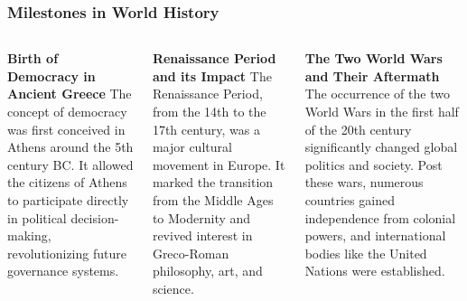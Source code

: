 \documentclass[5pt]{beamer}
\begin{document}
\begin{frame}
\frametitle{Milestones in World History}
\begin{columns}
\begin{column}{0.3\textwidth}
\begin{block}{\textbf{Birth of Democracy in Ancient Greece}}
The concept of democracy was first conceived in Athens around the 5th century BC. It allowed the citizens of Athens to participate directly in political decision-making, revolutionizing future governance systems.
\end{block}
\end{column}
\begin{column}{0.3\textwidth}
\begin{block}{\textbf{Renaissance Period and its Impact}}
The Renaissance Period, from the 14th to the 17th century, was a major cultural movement in Europe. It marked the transition from the Middle Ages to Modernity and revived interest in Greco-Roman philosophy, art, and science.
\end{block}
\end{column}
\begin{column}{0.3\textwidth}
\begin{block}{\textbf{The Two World Wars and Their Aftermath}}
The occurrence of the two World Wars in the first half of the 20th century significantly changed global politics and society. Post these wars, numerous countries gained independence from colonial powers, and international bodies like the United Nations were established.
\end{block}
\end{column}
\end{columns}
\end{frame}
\end{document}
